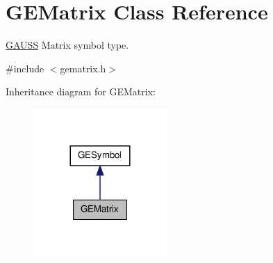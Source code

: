 \hypertarget{class_g_e_matrix}{\section{G\-E\-Matrix Class Reference}
\label{class_g_e_matrix}
}


\hyperlink{class_g_a_u_s_s}{G\-A\-U\-S\-S} Matrix symbol type.  




{\ttfamily \#include $<$gematrix.\-h$>$}



Inheritance diagram for G\-E\-Matrix\-:\nopagebreak
\begin{figure}[H]
\begin{center}
\leavevmode
\includegraphics[width=144pt]{class_g_e_matrix__inherit__graph}
\end{center}
\end{figure}
